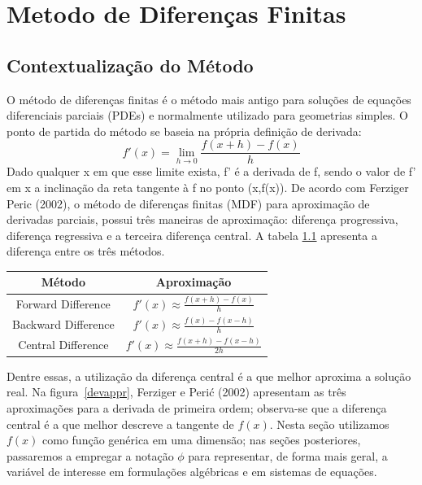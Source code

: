 \chapter{Metodo de Diferenças Finitas}
\label{cap:MDF}

\section{Contextualização do Método}

O método de diferenças finitas é o método mais antigo para soluções de equações diferenciais parciais (PDEs) e normalmente utilizado para geometrias simples. O ponto de partida do método se baseia na própria definição de derivada:
\begin{equation}
    f'(x) = \lim_{h \to 0} \frac{f(x+h) - f(x)}{h}
\end{equation}
Dado qualquer x em que esse limite exista, f' é a derivada de f, sendo o valor de f' em x a inclinação da reta tangente à f no ponto (x,f(x)). De acordo com Ferziger Peric (2002), o método de diferenças finitas (MDF) para aproximação de derivadas parciais, possui três maneiras de aproximação: diferença progressiva, diferença regressiva e a terceira diferença central. A tabela \ref{methodAppr} apresenta a diferença entre os três métodos.
\begin{table}[h!]
\label{methodAppr}
\centering
\begin{tabular}{|c|c|}
\hline
\textbf{Método} & \textbf{Aproximação} \\ \hline

Forward Difference 
& 
$\displaystyle f'(x) \approx \frac{f(x+h) - f(x)}{h}$ 
\\ \hline

Backward Difference 
& 
$\displaystyle f'(x) \approx \frac{f(x) - f(x-h)}{h}$ 
\\ \hline

Central Difference 
& 
$\displaystyle f'(x) \approx \frac{f(x+h) - f(x-h)}{2h}$ 
\\ \hline

\end{tabular}
\end{table}

Dentre essas, a utilização da diferença central é a que melhor aproxima a solução real. 
Na figura~\ref{devappr}, Ferziger e Perić (2002) apresentam as três aproximações para 
a derivada de primeira ordem; observa-se que a diferença central é a que melhor descreve 
a tangente de $f(x)$. Nesta seção utilizamos $f(x)$ como função genérica em uma dimensão; 
nas seções posteriores, passaremos a empregar a notação $\phi$ para representar, de forma 
mais geral, a variável de interesse em formulações algébricas e em sistemas de equações.

